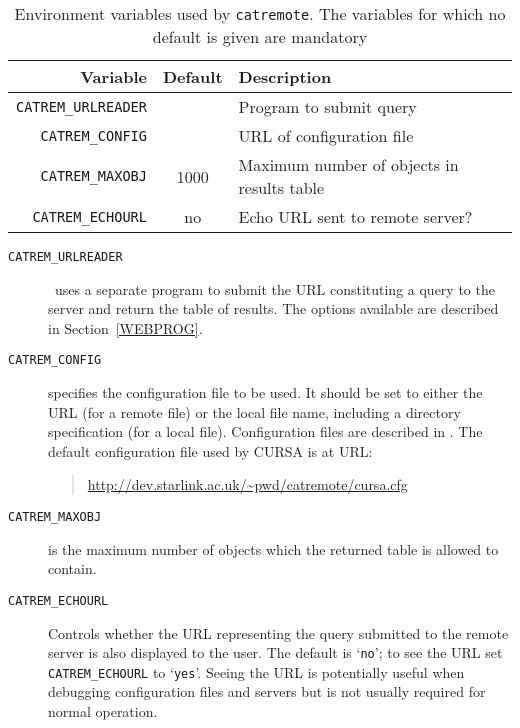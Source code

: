 \documentclass[twoside,11pt]{starlink}
\providecommand{\catremote}{\htmlref{\texttt{catremote}}{CATREMOTE}}
\begin{document}
\begin{table}[htbp]

\begin{center}
\begin{tabular}{rcl}
Variable                & Default   &  Description \\ \hline
\texttt{CATREM\_URLREADER} &      & Program to submit query \\
\texttt{CATREM\_CONFIG}    &      & URL of configuration file \\
\texttt{CATREM\_MAXOBJ}    & 1000 & Maximum number of objects in results table \\
\texttt{CATREM\_ECHOURL}   & no   & Echo URL sent to remote server? \\
\end{tabular}
\end{center}

\begin{quote}
\caption[Environment variables used by catremote]{Environment
variables used by \texttt{catremote}.  The variables for which no default
is given are mandatory
\label{ENVARS} }
\end{quote}

\end{table}

\begin{description}

  \item[\texttt{CATREM\_URLREADER}] \catremote\ uses a separate program
   to submit the URL constituting a query to the server and return the
   table of results.  The options available are described in
   Section~\ref{WEBPROG}.

  \item[\texttt{CATREM\_CONFIG}] specifies the configuration file to be used.
   It should be set to either the URL (for a remote file) or the local
   file name, including a directory specification (for a local file).
   Configuration files are described in \cite{SSN75}.
   The default configuration file used by CURSA is at URL:

  \begin{quote}
\url{http://dev.starlink.ac.uk/\~pwd/catremote/cursa.cfg}
  \end{quote}

  \item[\texttt{CATREM\_MAXOBJ}] is the maximum number of objects which the
   returned table is allowed to contain.

  \item[\texttt{CATREM\_ECHOURL}] Controls whether the URL representing the
   query submitted to the remote server is also displayed to the user.
   The default is `\texttt{no}'; to see the URL set \texttt{CATREM\_ECHOURL} to
   `\texttt{yes}'.  Seeing the URL is potentially useful when debugging
   configuration files and servers but is not usually required for
   normal operation.

\end{description}
\end{document}
